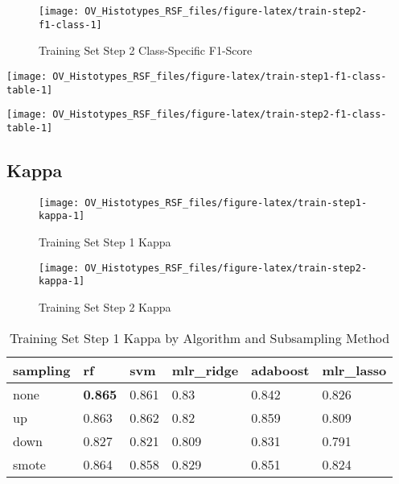 \documentclass[
]{report}
\begin{document}
\begin{figure}[H]

{\centering \texttt{[image: OV\_Histotypes\_RSF\_files/figure-latex/train-step2-f1-class-1]} 

}

\caption{Training Set Step 2 Class-Specific F1-Score}\label{fig:train-step2-f1-class}
\end{figure}

\begin{center}\texttt{[image: OV\_Histotypes\_RSF\_files/figure-latex/train-step1-f1-class-table-1]} \end{center}

\begin{center}\texttt{[image: OV\_Histotypes\_RSF\_files/figure-latex/train-step2-f1-class-table-1]} \end{center}

\hypertarget{kappa-1}{%
\subsection{Kappa}\label{kappa-1}}

\begin{figure}[H]

{\centering \texttt{[image: OV\_Histotypes\_RSF\_files/figure-latex/train-step1-kappa-1]} 

}

\caption{Training Set Step 1 Kappa}\label{fig:train-step1-kappa}
\end{figure}

\begin{figure}[H]

{\centering \texttt{[image: OV\_Histotypes\_RSF\_files/figure-latex/train-step2-kappa-1]} 

}

\caption{Training Set Step 2 Kappa}\label{fig:train-step2-kappa}
\end{figure}

\begin{table}

\caption{\label{tab:train-step1-kappa-table}Training Set Step 1 Kappa by Algorithm and Subsampling Method}
\centering
\begin{tabular}[t]{l|l|l|l|l|l}
\hline
sampling & rf & svm & mlr\_ridge & adaboost & mlr\_lasso\\
\hline
none & \textbf{0.865} & 0.861 & 0.83 & 0.842 & 0.826\\
\hline
up & 0.863 & 0.862 & 0.82 & 0.859 & 0.809\\
\hline
down & 0.827 & 0.821 & 0.809 & 0.831 & 0.791\\
\hline
smote & 0.864 & 0.858 & 0.829 & 0.851 & 0.824\\
\hline
\end{tabular}
\end{table}
\end{document}
